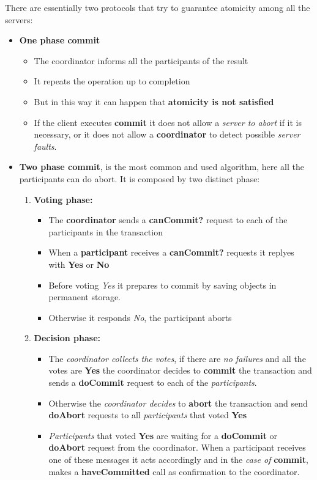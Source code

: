 There are essentially two protocols that try to guarantee atomicity among all the servers:
\begin{itemize}
    \item \textbf{One phase commit}
    \begin{itemize}
        \item The coordinator informs all the participants of the result
        \item It repeats the operation up to completion
        \item But in this way it can happen that \textbf{atomicity is not satisfied}
        \item If the client executes \textbf{commit} it does not allow a \textit{server to abort} if it is necessary, or it does not allow a \textbf{coordinator} to detect possible \textit{server faults}.
    \end{itemize}
    \item \textbf{Two phase commit}, is the most common and used algorithm, here all the participants can do abort. It is composed by two distinct phase:
    \begin{enumerate}
        \item \textbf{Voting phase:} 
        \begin{itemize}
            \item The \textbf{coordinator} sends a \textbf{canCommit?} request to each of the participants in the transaction
            \item When a \textbf{participant} receives a \textbf{canCommit?} requests it replyes with \textbf{Yes} or \textbf{No}
            \item Before voting \textit{Yes} it prepares to commit by saving objects in permanent storage.
            \item Otherwise it responds \textit{No}, the participant aborts
        \end{itemize}
        \item \textbf{Decision phase:}
        \begin{itemize}
            \item The \textit{coordinator collects the votes}, if there are \textit{no failures} and all the votes are \textbf{Yes} the coordinator decides to \textbf{commit} the transaction and sends a \textbf{doCommit} request to each of the \textit{participants}.
            \item Otherwise the \textit{coordinator decides} to \textbf{abort} the transaction and send \textbf{doAbort} requests to all \textit{participants} that voted \textbf{Yes}
            \item \textit{Participants} that voted \textbf{Yes} are waiting for a \textbf{doCommit} or \textbf{doAbort} request from the coordinator. When a participant receives one of these messages it acts accordingly and in the \textit{case of} \textbf{commit}, makes a \textbf{haveCommitted} call as confirmation to the coordinator.
        \end{itemize}
    \end{enumerate}
\end{itemize}

